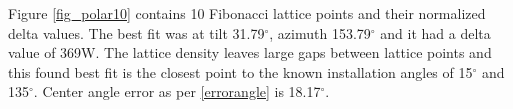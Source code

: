 Figure \ref{fig_polar10} contains 10 Fibonacci lattice points and their normalized delta values. The best fit was at tilt 31.79$^\circ$, azimuth 153.79$^\circ$ and it had a delta value of 369W. The lattice density leaves large gaps between lattice points and this found best fit is the closest point to the known installation angles of 15$^\circ$ and 135$^\circ$. Center angle error as per \ref{errorangle} is 18.17$^\circ$.







